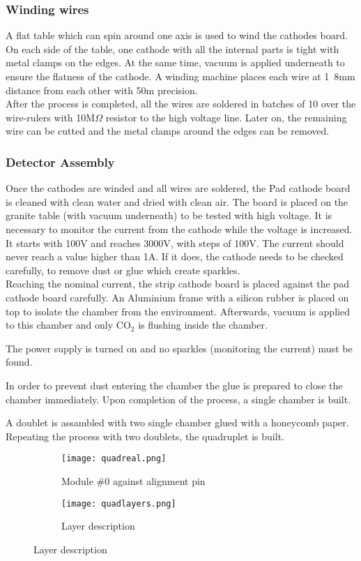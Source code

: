 \subsubsection{Winding wires}
A flat table which can spin around one axis is used to wind the cathodes board.
On each side of the table, one cathode with all the internal parts is tight with metal clamps on
the edges.
At the same time, vacuum is applied underneath to ensure the flatness of the cathode. 
A winding machine places each wire at \unit{1.8}{mm} distance from each other with
\unit{50}{\micro m} precision.\\ 
After the process is completed, all the wires are soldered in batches of 10
over the wire-rulers with \unit{10}{M$\Omega$} resistor to the high voltage line.
Later on, the remaining wire can be cutted and the metal clamps around the edges can be removed. 

\subsubsection{Detector Assembly}

Once the cathodes are winded and all wires are soldered, the Pad cathode board is cleaned with clean water and dried with clean air.
The board is placed on the granite table (with vacuum underneath) to be tested with high voltage.
It is necessary to monitor the current from the cathode while the voltage is increased.
It starts with 100V and reaches 3000V, with steps of  100V.  The current should never reach a value higher than
\unit{1}{\micro A}. If it does, the cathode needs to be checked carefully, to remove dust or glue which create sparkles.\\ 
Reaching the nominal current, the strip cathode board is placed against the pad cathode board
carefully.
An Aluminium frame with a silicon rubber is placed on top to isolate the chamber from the environment.
Afterwards, vacuum is applied to this chamber and only CO$_2$ is flushing inside the chamber.\par
The power supply is turned on and no sparkles (monitoring the current) must be found.\par
In order to prevent dust entering the chamber the glue is prepared to close the chamber immediately.
Upon completion of the process, a single chamber is built.\par
A doublet is assambled with two single chamber glued with a honeycomb paper. Repeating the process with two doublets,
the quadruplet is built.
\begin{figure}[ht]
\centering
\hspace*{\fill}
{\begin{subfigure}[b]{0.55\textwidth}
\texttt{[image: quadreal.png]}
\caption{Module \#0 against alignment pin}\label{}
\end{subfigure}
}\hfill
{\begin{subfigure}[b]{0.35\textwidth}
\texttt{[image: quadlayers.png]}
\caption{Layer description}\label{quad}
\end{subfigure}
}\hspace*{\fill}
\end{figure}


